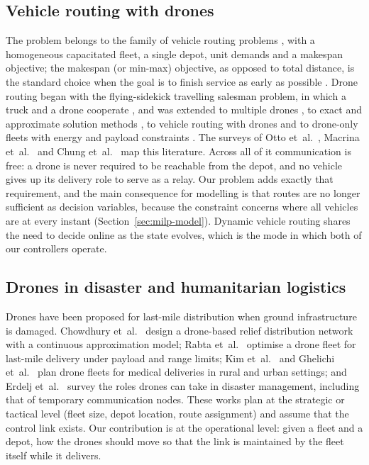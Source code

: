 \documentclass[final,5p,times,twocolumn]{elsarticle}
\begin{document}
\subsection{Vehicle routing with drones}
\label{sec:rel-vrp}
The problem belongs to the family of vehicle routing problems \cite{dantzig1959,toth2014}, with
a homogeneous capacitated fleet, a single depot, unit demands and a makespan objective; the
makespan (or min-max) objective, as opposed to total distance, is the standard choice when the
goal is to finish service as early as possible \cite{park2023,kitjacharoenchai2019}. Drone
routing began with the flying-sidekick travelling salesman problem, in which a truck and a drone
cooperate \cite{murray2015}, and was extended to multiple drones \cite{murray2020}, to exact and
approximate solution methods \cite{agatz2018,ha2018,roberti2021,dell2021}, to vehicle routing
with drones \cite{poikonen2017,sacramento2019,schermer2019} and to drone-only fleets with
energy and payload constraints \cite{dorling2017}. The surveys of Otto et~al.\ \cite{otto2018},
Macrina et~al.\ \cite{macrina2020} and Chung et~al.\ \cite{chung2020} map this literature.
Across all of it communication is free: a drone is never required to be reachable from the
depot, and no vehicle gives up its delivery role to serve as a relay. Our problem adds exactly
that requirement, and the main consequence for modelling is that routes are no longer sufficient
as decision variables, because the constraint concerns where all vehicles are at every instant
(Section~\ref{sec:milp-model}). Dynamic vehicle routing \cite{pillac2013} shares the need to
decide online as the state evolves, which is the mode in which both of our controllers operate.

\subsection{Drones in disaster and humanitarian logistics}
\label{sec:rel-disaster}
Drones have been proposed for last-mile distribution when ground infrastructure is damaged.
Chowdhury et~al.\ \cite{chowdhury2017} design a drone-based relief distribution network with a
continuous approximation model; Rabta et~al.\ \cite{rabta2018} optimise a drone fleet for
last-mile delivery under payload and range limits; Kim et~al.\ \cite{kim2017} and Ghelichi et~al.\
\cite{ghelichi2021} plan drone fleets for medical deliveries in rural and urban settings; and
Erdelj et~al.\ \cite{erdelj2017} survey the roles drones can take in disaster management,
including that of temporary communication nodes. These works plan at the strategic or tactical
level (fleet size, depot location, route assignment) and assume that the control link exists.
Our contribution is at the operational level: given a fleet and a depot, how the drones should
move so that the link is maintained by the fleet itself while it delivers.
\end{document}
